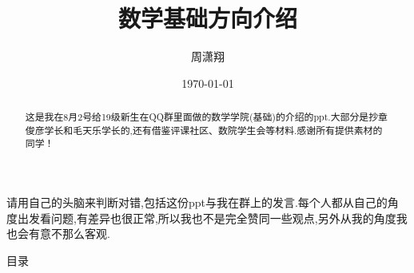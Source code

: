 \documentclass[pdf]{beamer}
\title{数学基础方向介绍}
\author{周潇翔}
\institute[USTC]{University of Science and Technology of China}
\date{\today}
\numberwithin{equation}{section}
\theoremstyle{plain}
\theoremstyle{plain}
\theoremstyle{plain}
\theoremstyle{remark}
\begin{document}
	\begin{frame}
	\titlepage
	\end{frame}
\begin{frame}
\begin{abstract}
\hspace*{20pt}这是我在8月2号给19级新生在QQ群里面做的数学学院(基础)的介绍的ppt.大部分是抄章俊彦学长和毛天乐学长的,还有借鉴评课社区、数院学生会等材料.感谢所有提供素材的同学！
\end{abstract}

\hspace*{20pt}请用自己的头脑来判断对错,包括这份ppt与我在群上的发言.每个人都从自己的角度出发看问题,有差异也很正常,所以我也不是完全赞同一些观点,另外从我的角度我也会有意不那么客观.
\end{frame}

\begin{frame}{目录}
	\tableofcontents
\end{frame}
\end{document}
